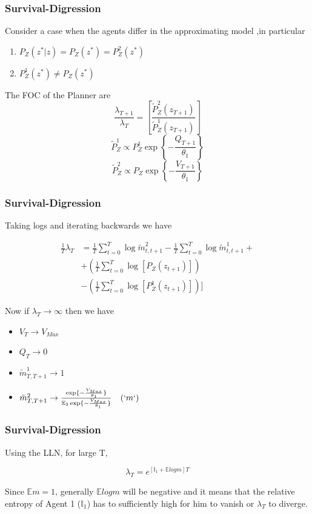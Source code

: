 \documentclass{beamer}
\theoremstyle{definition}
\begin{document}
\begin{frame}
\frametitle{Survival-Digression}
Consider a case when the agents differ in the approximating model	,in particular
\begin{enumerate}
\item $P_Z(z^*|z)=P_Z(z^*)=P^2_Z(z^*)$
\item $P_Z^1(z^*) \neq P_Z(z^*)$
\end{enumerate}
%
The FOC of the Planner are 
%
\[\frac{\lambda_{T+1}}{\lambda_{T}} =\left[\frac{\tilde{P}^2_Z(z_{T+1})}{\tilde{P}^1_{Z}(z_{T+1})}\right]\]
\[\tilde{P}^1_Z \propto P^1_Z \exp \left\{-\frac{Q_{T+1}}{\theta_1}\right\}\]
\[\tilde{P}^2_Z \propto P_Z \exp \left\{-\frac{V_{T+1}}{\theta_1}\right\}\]
%
\end{frame}



\begin{frame}
\frametitle{Survival-Digression}

Taking logs and iterating backwards we have

\begin{eqnarray*}
\frac{1}{T}\lambda_{T}&=\frac{1}{T}\sum_{t=0}^{T}\log\tilde{m}^2_{t,t+1}-\frac{1}{T}\sum_{t=0}^{T}\log \tilde{m}^1_{t,t+1}+\\ &+ \left( \frac{1}{T}\sum_{t=0}^{T}\log[P_Z(z_{t+1})]\right)\\
&- \left( \frac{1}{T}\sum_{t=0}^{T}\log[P^1_Z(z_{t+1})]\right)]
\end{eqnarray*}


Now if $\lambda_{T}\to \infty$ then we have
\begin{itemize}
\item $V_{T}\to V_{Max}$
\item $Q_{T}\to 0$
\item $\tilde{m}^1_{T,T+1} \to 1$
\item $\tilde{m}^2_{T,T+1} \to \frac{\exp \{-\frac{V_{Max}}{\theta_1}\}}{\mathbb{E}_2 \exp\{-\frac{V_{Max}}{\theta_1}\}} \quad (`m`)$
\end{itemize}
\end{frame}


\begin{frame}
\frametitle{Survival-Digression}
Using the LLN, for large T,

\[\lambda_T=e^{[\mathbb{I}_1 + \mathbb{E} log m]T} \]

Since $\mathbb{E}m=1$, generally $\mathbb{E} log m$ will be negative
and it means that the relative entropy of Agent 1 ($\mathbb{I}_1$) has to sufficiently
high for him to vanish or $\lambda_T$ to diverge.


\end{frame}
\end{document}

